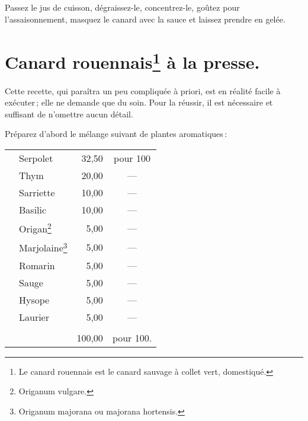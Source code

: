 Passez le jus de cuisson, dégraissez-le, concentrez-le, goûtez pour
l'assaisonnement, masquez le canard avec la sauce et laissez prendre en gelée.

\section*{\centering Canard rouennais\footnote{Le canard rouennais est le canard
                              sauvage à collet vert, domestiqué.} à la presse.}
{}

Cette recette, qui paraîtra un peu compliquée à priori, est en réalité facile
à exécuter ; elle ne demande que du soin. Pour la réussir, il est nécessaire et
suffisant de n'omettre aucun détail.

\medskip

Préparez d'abord le mélange suivant de plantes aromatiques :

\medskip

\label{pg0584} \hypertarget{p0584}{}
\footnotesize
\begin{longtable}{p{0.5em}p{16em}rc}
& Serpolet   \dotfill                                             &  32,50 & pour 100                     \\
& Thym       \dotfill                                             &  20,00 & —                            \\
& Sarriette  \dotfill                                             &  10,00 & —                            \\
& Basilic    \dotfill                                             &  10,00 & —                            \\
& Origan\footnote{Origanum vulgare.}
             \dotfill                                             &   5,00 & —                            \\
& Marjolaine\footnote{Origanum majorana ou majorana hortensis.}
             \dotfill                                             &   5,00 & —                            \\
& Romarin    \dotfill                                             &   5,00 & —                            \\
& Sauge      \dotfill                                             &   5,00 & —                            \\
& Hysope     \dotfill                                             &   5,00 & —                            \\
& Laurier    \dotfill                                             &   5,00 & —                            \\
&                                                                 &  \multicolumn{2}{r}{\hrulefill}       \\
&                                                                 & 100,00 & pour 100.                    \\
\end{longtable}
\normalsize

